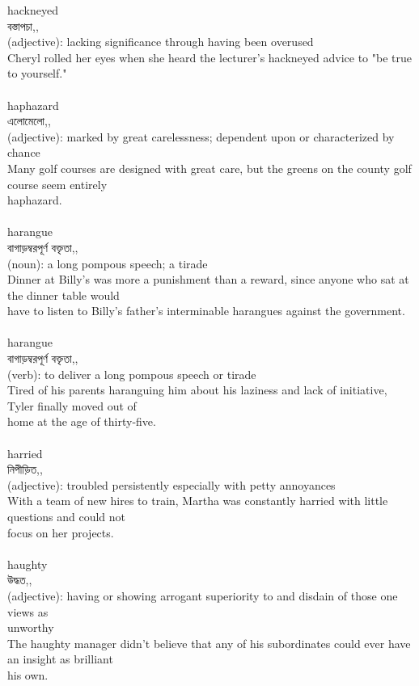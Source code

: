 \documentclass{article}
\begin{document}
{hackneyed}\\
{বস্তাপচা,,}\\
{(adjective): lacking significance through having been overused\\Cheryl rolled her eyes when she heard the lecturer's hackneyed advice to "be true to yourself."\\}\\
{haphazard}\\
{এলোমেলো,,}\\
{(adjective): marked by great carelessness; dependent upon or characterized by chance\\Many golf courses are designed with great care, but the greens on the county golf course seem entirely\\haphazard.\\}\\
{harangue}\\
{বাগাড়ম্বরপূর্ণ বক্তৃতা,,}\\
{(noun): a long pompous speech; a tirade\\Dinner at Billy's was more a punishment than a reward, since anyone who sat at the dinner table would\\have to listen to Billy's father's interminable harangues against the government.\\}\\
{harangue}\\
{বাগাড়ম্বরপূর্ণ বক্তৃতা,,}\\
{(verb): to deliver a long pompous speech or tirade\\Tired of his parents haranguing him about his laziness and lack of initiative, Tyler finally moved out of\\home at the age of thirty-five.\\}\\
{harried}\\
{নিপীড়িত,,}\\
{(adjective): troubled persistently especially with petty annoyances\\With a team of new hires to train, Martha was constantly harried with little questions and could not\\focus on her projects.\\}\\
{haughty}\\
{উদ্ধত,,}\\
{(adjective): having or showing arrogant superiority to and disdain of those one views as\\unworthy\\The haughty manager didn't believe that any of his subordinates could ever have an insight as brilliant\\his own.\\}\\
\end{document}
